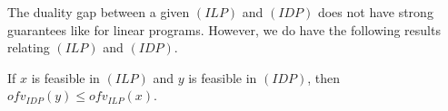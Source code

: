 The duality gap between a given $(ILP)$ and $(IDP)$ does not have strong guarantees like for linear programs. However, we do have the following results relating $(ILP)$ and $(IDP)$.

\begin{thm}
    \label{thm:weak-duality-ILP}
    If $x$ is feasible in $(ILP)$ and $y$ is feasible in $(IDP)$, then $ofv_{IDP}(y) \le ofv_{ILP}(x)$.
\end{thm}